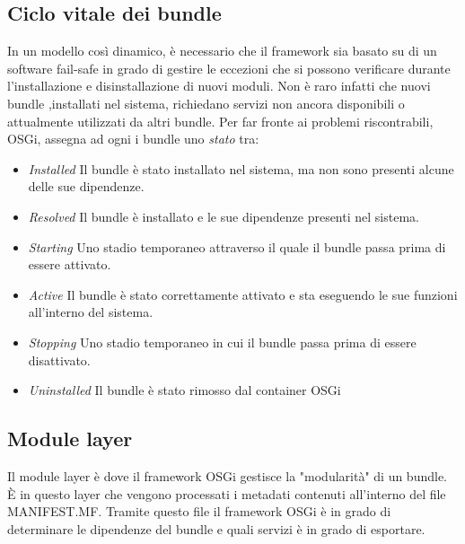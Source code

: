 \subsection{Ciclo vitale dei bundle}\hypertarget{cycle_bundle}{}
In un modello così dinamico, è necessario che il framework sia basato su di un
software fail-safe in grado di gestire le eccezioni che si possono verificare
durante l'installazione e disinstallazione di nuovi moduli.
Non è raro infatti che nuovi bundle ,installati nel sistema, richiedano servizi
non ancora disponibili o attualmente utilizzati da altri bundle.
Per far fronte ai problemi riscontrabili, OSGi, assegna ad ogni  i bundle  uno 
\emph{stato} tra:
\begin{itemize}
        \item   \textit{Installed} Il bundle è stato installato nel sistema, ma
                non sono presenti alcune delle sue dipendenze.
        \item   \textit{Resolved} Il bundle è installato e le sue dipendenze
                presenti nel sistema.
        \item   \textit{Starting} Uno stadio temporaneo attraverso il quale il
                bundle passa prima di essere attivato.
        \item   \textit{Active} Il bundle è stato correttamente attivato e sta
                eseguendo le sue funzioni all'interno del sistema.
        \item   \textit{Stopping} Uno stadio temporaneo in cui il bundle passa
                prima di essere disattivato.
        \item   \textit{Uninstalled} Il bundle è stato rimosso dal container
                OSGi
\end{itemize}

\subsection{Module layer}
Il module layer è dove il framework OSGi gestisce la "modularità" di un bundle.
È in questo layer che vengono processati i metadati contenuti all'interno del
file MANIFEST.MF. Tramite questo file il framework OSGi è in grado di
determinare le dipendenze del bundle e quali servizi è in grado di esportare.

